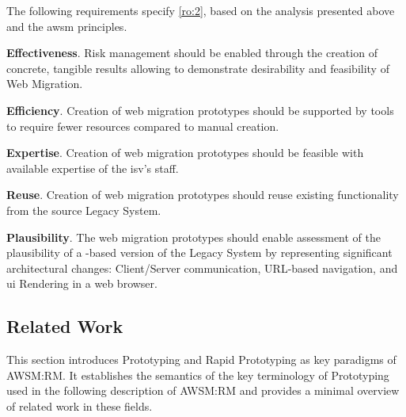 The following requirements specify \cref{ro:2}, based on the analysis presented above and the \gls{awsm} principles.

\textbf{Effectiveness}. Risk management should be enabled through the creation of concrete, tangible results allowing to demonstrate desirability and feasibility of \gls{Web Migration}.

\vspace{-10pt}
\textbf{Efficiency}. Creation of \glspl{web migration prototype} should be supported by tools to require fewer resources compared to manual creation.

\vspace{-10pt}
\textbf{Expertise}. Creation of \glspl{web migration prototype} should be feasible with available expertise of the \gls{isv}'s staff.

\vspace{-10pt}
\textbf{Reuse}. Creation of \glspl{web migration prototype} should reuse existing functionality from the source \gls{Legacy System}.

\vspace{-10pt}
\textbf{Plausibility}. The \glspl{web migration prototype} should enable assessment of the plausibility of a -based version of the \gls{Legacy System} by representing significant architectural changes: Client/Server communication, URL-based navigation, and \gls{ui} Rendering in a \gls{web} browser.

\vspace{-15pt}
\hypertarget{sec:awsm-rm:related-work}{%
\subsection{Related Work}\label{sec:awsm-rm:related-work}}
\vspace{10pt}

This section introduces \gls{Prototyping} and \gls{Rapid Prototyping} as key paradigms of AWSM:RM.
It establishes the semantics of the key terminology of \gls{Prototyping} used in the following description of AWSM:RM and provides a minimal overview of related work in these fields.

